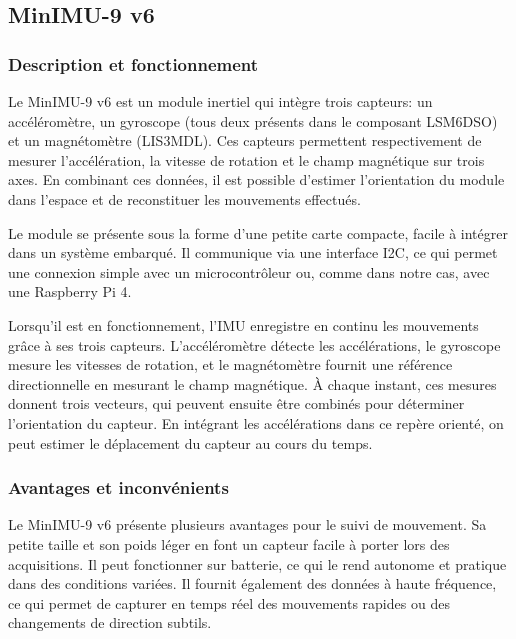 \subsection{MinIMU-9 v6}

\vspace{2em}

\subsubsection{Description et fonctionnement}

Le MinIMU-9 v6 est un module inertiel qui intègre trois capteurs: un accéléromètre, un gyroscope (tous deux présents dans le composant LSM6DSO) et un magnétomètre (LIS3MDL). Ces capteurs permettent respectivement de mesurer l’accélération, la vitesse de rotation et le champ magnétique sur trois axes. En combinant ces données, il est possible d’estimer l’orientation du module dans l’espace et de reconstituer les mouvements effectués.

\vspace{1em}

Le module se présente sous la forme d’une petite carte compacte, facile à intégrer dans un système embarqué. Il communique via une interface I2C, ce qui permet une connexion simple avec un microcontrôleur ou, comme dans notre cas, avec une Raspberry Pi 4.

\vspace{1em}

Lorsqu’il est en fonctionnement, l’IMU enregistre en continu les mouvements grâce à ses trois capteurs. L’accéléromètre détecte les accélérations, le gyroscope mesure les vitesses de rotation, et le magnétomètre fournit une référence directionnelle en mesurant le champ magnétique. À chaque instant, ces mesures donnent trois vecteurs, qui peuvent ensuite être combinés pour déterminer l’orientation du capteur. En intégrant les accélérations dans ce repère orienté, on peut estimer le déplacement du capteur au cours du temps.

\vspace{2em}

\subsubsection{Avantages et inconvénients}

Le MinIMU-9 v6 présente plusieurs avantages pour le suivi de mouvement. Sa petite taille et son poids léger en font un capteur facile à porter lors des acquisitions. Il peut fonctionner sur batterie, ce qui le rend autonome et pratique dans des conditions variées. Il fournit également des données à haute fréquence, ce qui permet de capturer en temps réel des mouvements rapides ou des changements de direction subtils.

